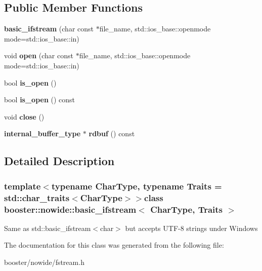 \subsection*{Public Member Functions}
\begin{DoxyCompactItemize}
\item 
{\bfseries basic\-\_\-ifstream} (char const $\ast$file\-\_\-name, std\-::ios\-\_\-base\-::openmode mode=std\-::ios\-\_\-base\-::in)\label{classbooster_1_1nowide_1_1basic__ifstream_a349a1df7d87c85422e67574d8d0f17ab}

\item 
void {\bfseries open} (char const $\ast$file\-\_\-name, std\-::ios\-\_\-base\-::openmode mode=std\-::ios\-\_\-base\-::in)\label{classbooster_1_1nowide_1_1basic__ifstream_a09b6a2cb66805759abd7c130e18b5896}

\item 
bool {\bfseries is\-\_\-open} ()\label{classbooster_1_1nowide_1_1basic__ifstream_a5ab0ecf734809cf43f3753783e797357}

\item 
bool {\bfseries is\-\_\-open} () const \label{classbooster_1_1nowide_1_1basic__ifstream_aaba31ae640976c974c60f1e560379007}

\item 
void {\bfseries close} ()\label{classbooster_1_1nowide_1_1basic__ifstream_af39fe9e62c854ea5ba2333d469a6cf79}

\item 
{\bf internal\-\_\-buffer\-\_\-type} $\ast$ {\bfseries rdbuf} () const \label{classbooster_1_1nowide_1_1basic__ifstream_a1ac8e4f67a2f66b6be0ac15a20c078ae}

\end{DoxyCompactItemize}


\subsection{Detailed Description}
\subsubsection*{template$<$typename Char\-Type, typename Traits = std\-::char\-\_\-traits$<$\-Char\-Type$>$$>$class booster\-::nowide\-::basic\-\_\-ifstream$<$ Char\-Type, Traits $>$}

Same as std\-::basic\-\_\-ifstream$<$char$>$ but accepts U\-T\-F-\/8 strings under Windows 

The documentation for this class was generated from the following file\-:\begin{DoxyCompactItemize}
\item 
booster/nowide/fstream.\-h\end{DoxyCompactItemize}
